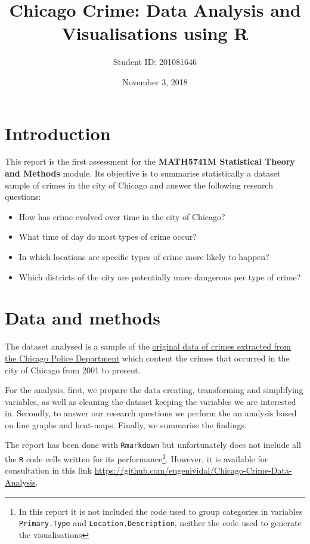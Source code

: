 \documentclass[]{article}
\title{Chicago Crime: Data Analysis and Visualisations using R}
\author{Student ID: 201081646}
\date{November 3, 2018}
\let\rmarkdownfootnote\footnote%
\def\footnote{\protect\rmarkdownfootnote}
\begin{document}
\maketitle

\section{Introduction}\label{introduction}

This report is the first assessment for the \textbf{MATH5741M
Statistical Theory and Methods} module. Its objective is to summarise
statistically a dataset sample of crimes in the city of Chicago and
answer the following research questions:

\begin{itemize}
\item
  How has crime evolved over time in the city of Chicago?
\item
  What time of day do most types of crime occur?
\item
  In which locations are specific types of crime more likely to happen?
\item
  Which districts of the city are potentially more dangerous per type of
  crime?
\end{itemize}

\section{Data and methods}\label{data-and-methods}

The dataset analysed is a sample of the
\href{https://data.cityofchicago.org/Public-Safety/Crimes-2001-to-present/ijzp-q8t2}{original
data of crimes extracted from the Chicago Police Department} which
content the crimes that occurred in the city of Chicago from 2001 to
present.

For the analysis, first, we prepare the data creating, transforming and
simplifying variables, as well as cleaning the dataset keeping the
variables we are interested in. Secondly, to answer our research
questions we perform the an analysis based on line graphs and heat-maps.
Finally, we summarise the findings.

The report has been done with \texttt{Rmarkdown} but unfortunately does
not include all the \texttt{R} code cells written for its
performance\footnote{In this report it is not included the code used to
  group categories in variables \texttt{Primary.Type} and
  \texttt{Location.Description}, neither the code used to generate the
  visualisations}. However, it is available for consultation in this
link \url{https://github.com/eugenividal/Chicago-Crime-Data-Analysis}.
\end{document}
